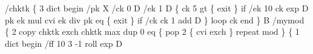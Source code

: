 \documentclass[11pt]{article}
\begin{document}

\nwenddocs{}\endmoddef
/chktk \{          %
  3 dict begin    %
    /pk X         %
    /ck 0 D       %
    /ek 1 D       %
    \{             %
      ck 5 gt \{   %
        exit      %
      \} if        %
      /ek         %
        10 ck exp %
      D           %
      pk ek mul   %
      cvi         %
      ek div      %
      pk eq \{     %
        exit      %
      \} if        %
      /ck         %
        ck 1 add  %
      D           %
    \} loop        %
    ck            %
  end             %
\} B               %
/mymod \{          %
  2 copy          %
  chktk           %
  exch            %
  chktk           %
  max             %
  dup 0 eq \{      %
    pop           %
    2 \{           %
      cvi exch    %
    \} repeat      %
    mod           %
  \} \{             %
    1 dict begin  %
      /ff         %
        10        %
        3 -1 roll %
        exp       %
      D           %
\end{document}
